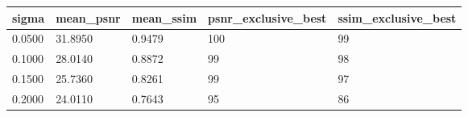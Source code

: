 \begin{tabular}{lllll}
\toprule
sigma & mean\_psnr & mean\_ssim & psnr\_exclusive\_best & ssim\_exclusive\_best \\
\midrule
0.0500 & 31.8950 & 0.9479 & 100 & 99 \\
0.1000 & 28.0140 & 0.8872 & 99 & 98 \\
0.1500 & 25.7360 & 0.8261 & 99 & 97 \\
0.2000 & 24.0110 & 0.7643 & 95 & 86 \\
\bottomrule
\end{tabular}
